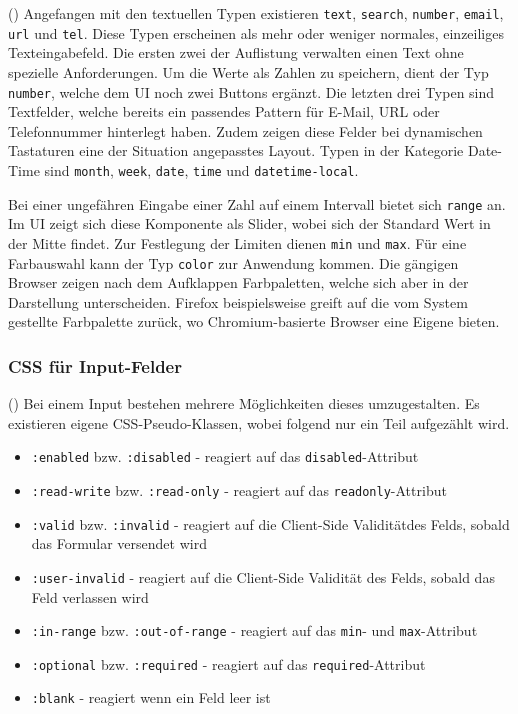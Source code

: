 (\cite{datalistMdn}) Angefangen mit den textuellen Typen existieren \texttt{text}, \texttt{search}, \texttt{number}, \texttt{email}, \texttt{url} und \texttt{tel}.
Diese Typen erscheinen als mehr oder weniger normales, einzeiliges Texteingabefeld.
Die ersten zwei der Auflistung verwalten einen Text ohne spezielle Anforderungen. 
Um die Werte als Zahlen zu speichern, dient der Typ \texttt{number}, welche dem UI noch zwei Buttons ergänzt.
Die letzten drei Typen sind Textfelder, welche bereits ein passendes Pattern für E-Mail, URL oder Telefonnummer hinterlegt haben.
Zudem zeigen diese Felder bei dynamischen Tastaturen eine der Situation angepasstes Layout\footnotemark.
Typen in der Kategorie Date-Time sind \texttt{month}, \texttt{week}, \texttt{date}, \texttt{time} und \texttt{datetime-local}.

Bei einer ungefähren Eingabe einer Zahl auf einem Intervall bietet sich \texttt{range} an.
Im UI zeigt sich diese Komponente als Slider, wobei sich der Standard Wert in der Mitte findet.
Zur Festlegung der Limiten dienen \texttt{min} und \texttt{max}.
Für eine Farbauswahl kann der Typ \texttt{color} zur Anwendung kommen. 
Die gängigen Browser zeigen nach dem Aufklappen Farbpaletten, welche sich aber in der Darstellung unterscheiden. 
Firefox beispielsweise greift auf die vom System gestellte Farbpalette zurück, wo Chromium-basierte Browser eine Eigene bieten.


\subsubsection{{\color{dgray} CSS für Input-Felder}}
\label{sec:inputCss}

(\cite{inputMdn}) Bei einem Input bestehen mehrere Möglichkeiten dieses umzugestalten.
Es existieren eigene CSS-Pseudo-Klassen, wobei folgend nur ein Teil aufgezählt wird.

\begin{itemize}
    \item \texttt{:enabled} bzw. \texttt{:disabled} - reagiert auf das \texttt{disabled}-Attribut
    \item \texttt{:read-write} bzw. \texttt{:read-only} - reagiert auf das \texttt{readonly}-Attribut
    \item \texttt{:valid} bzw. \texttt{:invalid} - reagiert auf die Client-Side Validität\footnotemark des Felds, sobald das Formular versendet wird
    \item \texttt{:user-invalid} - reagiert auf die Client-Side Validität des Felds, sobald das Feld verlassen wird
    \item \texttt{:in-range} bzw. \texttt{:out-of-range} - reagiert auf das \texttt{min}- und \texttt{max}-Attribut
    \item \texttt{:optional} bzw. \texttt{:required} - reagiert auf das \texttt{required}-Attribut
    \item \texttt{:blank} - reagiert wenn ein Feld leer ist
\end{itemize}

